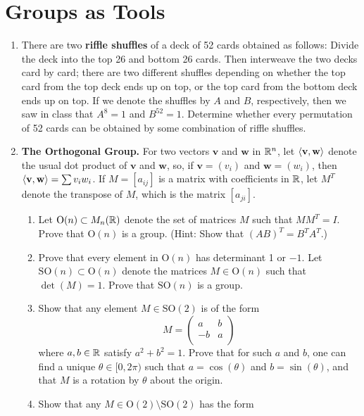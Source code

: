 \documentclass[../psets.tex]{subfiles}
\begin{document}
\section{Groups as Tools}
\begin{enumerate}
    \item {}There are two \textbf{riffle shuffles} of a deck of 52 cards obtained as follows: Divide the deck into the top 26 and bottom 26 cards. Then interweave the two decks card by card; there are two different shuffles depending on whether the top card from the top deck ends up on top, or the top card from the bottom deck ends up on top. If we denote the shuffles by $A$ and $B$, respectively, then we saw in class that $A^8=1$ and $B^{52}=1$. Determine whether every permutation of 52 cards can be obtained by some combination of riffle shuffles.
    \item \textbf{The Orthogonal Group.} For two vectors $\mathbf{v}$ and $\mathbf{w}$ in $\mathbb{R}^n$, let $\left\langle{\mathbf{v}},{\mathbf{w}}\right\rangle$ denote the usual dot product of $\mathbf{v}$ and $\mathbf{w}$, so, if $\mathbf{v}=(v_i)$ and $\mathbf{w}=(w_i)$, then $\left\langle{\mathbf{v}},{\mathbf{w}}\right\rangle=\sum v_iw_i$. If $M=[a_{ij}]$ is a matrix with coefficients in $\mathbb{R}$, let $M^T$ denote the transpose of $M$, which is the matrix $[a_{ji}]$.
    \begin{enumerate}
        \item Let $\text{O}(n)\subset M_n(\mathbb{R})$ denote the set of matrices $M$ such that $MM^T=I$. Prove that $\text{O}(n)$ is a group. (Hint: Show that $(AB)^T=B^TA^T$.)
        \item Prove that every element in $\text{O}(n)$ has determinant 1 or $-1$. Let $\text{SO}(n)\subset\text{O}(n)$ denote the matrices $M\in\text{O}(n)$ such that $\det(M)=1$. Prove that $\text{SO}(n)$ is a group.
        \item Show that any element $M\in\text{SO}(2)$ is of the form
        \begin{equation*}
            M =
            \begin{pmatrix}
                a & b\\
                -b & a\\
            \end{pmatrix}
        \end{equation*}
        where $a,b\in\mathbb{R}$ satisfy $a^2+b^2=1$. Prove that for such $a$ and $b$, one can find a unique $\theta\in[0,2\pi)$ such that $a=\cos(\theta)$ and $b=\sin(\theta)$, and that $M$ is a rotation by $\theta$ about the origin.
        \item Show that any $M\in\text{O}(2)\setminus\text{SO}(2)$ has the form

\end{enumerate}
\end{enumerate}
\end{document}
